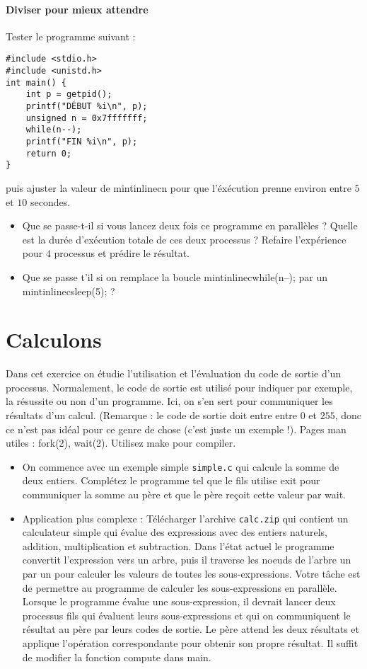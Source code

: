 \documentclass[11pt]{article}
\begin{document}
\paragraph{Diviser pour mieux attendre}

Tester le programme suivant :
\begin{verbatim}
#include <stdio.h>
#include <unistd.h>
int main() {
    int p = getpid();
    printf("DÉBUT %i\n", p);
    unsigned n = 0x7fffffff;
    while(n--);
    printf("FIN %i\n", p);
    return 0;
}
\end{verbatim}

puis ajuster la valeur de mintinline{c}{n} pour que l'éxécution prenne environ entre \(5\) et \(10\) secondes.

\begin{itemize}
\item Que se passe-t-il si vous lancez deux fois ce programme en parallèles ? Quelle est la durée d'exécution totale de ces deux processus ? Refaire l'expérience pour \(4\) processus et prédire le résultat.
\item Que se passe t'il si on remplace la boucle mintinline{c}{while(n--);} par un mintinline{c}{sleep(5);} ?
\end{itemize}

\section{Calculons}

Dans cet exercice on  étudie l'utilisation et  l'évaluation du code de sortie d’un processus. Normalement, le code de sortie est utilisé pour indiquer par exemple, la résussite ou non d’un programme.
Ici, on s’en sert pour communiquer les résultats d’un calcul. (Remarque : le code de sortie doit
entre entre \(0\) et \(255\), donc ce n'est pas idéal pour ce genre de chose (c'est juste un exemple !).
Pages man utiles : {fork(2)}, {wait(2)}. Utilisez {make} pour compiler.
\begin{itemize}
\item On commence avec un exemple simple \texttt{simple.c} qui calcule la somme de deux entiers.
  Complétez le programme tel que le fils utilise {exit} pour communiquer la somme au père et que le père reçoit cette valeur par {wait}.
\item Application plus complexe : Télécharger l'archive \texttt{calc.zip} qui contient un calculateur simple qui évalue des expressions avec des entiers naturels, addition, multiplication et subtraction.
Dans l'état actuel le programme convertit l'expression vers un arbre, puis il traverse les noeuds de l’arbre un par un pour calculer les valeurs de toutes les sous-expressions. Votre tâche est de permettre au programme de calculer les sous-expressions en parallèle. Lorsque le programme évalue une sous-expression, il devrait lancer deux processus fils qui  évaluent  leurs  sous-expressions  et  qui  on  communiquent  le  résultat  au  père  par leurs codes de sortie. Le père attend les deux résultats et applique l'opération correspondante pour obtenir son propre résultat. Il suffit de modifier la fonction
compute dans main.
\end{itemize}
\end{document}
